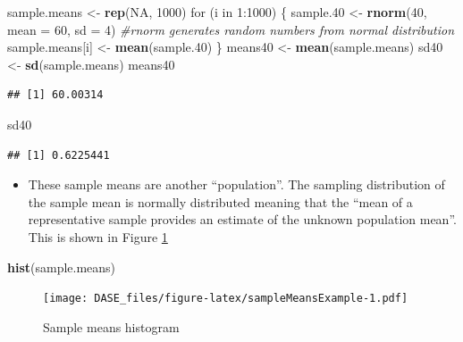 \documentclass[]{book}
\newenvironment{Shaded}{\begin{snugshade}}{\end{snugshade}}
\newcommand{\KeywordTok}[1]{\textcolor[rgb]{0.13,0.29,0.53}{\textbf{{#1}}}}
\newcommand{\DataTypeTok}[1]{\textcolor[rgb]{0.13,0.29,0.53}{{#1}}}
\newcommand{\DecValTok}[1]{\textcolor[rgb]{0.00,0.00,0.81}{{#1}}}
\newcommand{\FloatTok}[1]{\textcolor[rgb]{0.00,0.00,0.81}{{#1}}}
\newcommand{\StringTok}[1]{\textcolor[rgb]{0.31,0.60,0.02}{{#1}}}
\newcommand{\CommentTok}[1]{\textcolor[rgb]{0.56,0.35,0.01}{\textit{{#1}}}}
\newcommand{\OtherTok}[1]{\textcolor[rgb]{0.56,0.35,0.01}{{#1}}}
\newcommand{\NormalTok}[1]{{#1}}
\providecommand{\tightlist}{%
  \setlength{\itemsep}{0pt}\setlength{\parskip}{0pt}}
\begin{document}
\begin{Shaded}
\begin{Highlighting}[]
\NormalTok{sample.means <-}\StringTok{ }\KeywordTok{rep}\NormalTok{(}\OtherTok{NA}\NormalTok{, }\DecValTok{1000}\NormalTok{)}
\NormalTok{for (i in }\DecValTok{1}\NormalTok{:}\DecValTok{1000}\NormalTok{) \{}
  \NormalTok{sample}\FloatTok{.40} \NormalTok{<-}\StringTok{ }\KeywordTok{rnorm}\NormalTok{(}\DecValTok{40}\NormalTok{, }\DataTypeTok{mean =} \DecValTok{60}\NormalTok{, }\DataTypeTok{sd =} \DecValTok{4}\NormalTok{) }\CommentTok{#rnorm generates random numbers from normal distribution}
  \NormalTok{sample.means[i] <-}\StringTok{ }\KeywordTok{mean}\NormalTok{(sample}\FloatTok{.40}\NormalTok{)}
\NormalTok{\}}
\NormalTok{means40 <-}\StringTok{ }\KeywordTok{mean}\NormalTok{(sample.means)}
\NormalTok{sd40 <-}\StringTok{ }\KeywordTok{sd}\NormalTok{(sample.means)}
\NormalTok{means40}
\end{Highlighting}
\end{Shaded}

\begin{verbatim}
## [1] 60.00314
\end{verbatim}

\begin{Shaded}
\begin{Highlighting}[]
\NormalTok{sd40}
\end{Highlighting}
\end{Shaded}

\begin{verbatim}
## [1] 0.6225441
\end{verbatim}

\begin{itemize}
\tightlist
\item
  These sample means are another ``population''. The sampling
  distribution of the sample mean is normally distributed meaning that
  the ``mean of a representative sample provides an estimate of the
  unknown population mean''. This is shown in Figure
  \ref{fig:sampleMeansExample}
\end{itemize}

\begin{Shaded}
\begin{Highlighting}[]
\KeywordTok{hist}\NormalTok{(sample.means)}
\end{Highlighting}
\end{Shaded}

\begin{figure}[htbp]
\centering
\texttt{[image: DASE\_files/figure-latex/sampleMeansExample-1.pdf]}
\caption{\label{fig:sampleMeansExample}Sample means histogram}
\end{figure}
\end{document}
